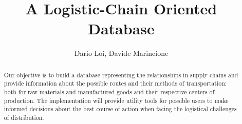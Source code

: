 \documentclass[a4paper, draft, technote, twocolumn, romanappendices]{IEEEtran}
\begin{document}
    \title{A Logistic-Chain Oriented Database}
    \author{Dario Loi, Davide Marincione}
    \maketitle
    \begin{abstract}
        Our objective is to build a database representing the relationships
        in supply chains and provide information about the possible routes
        and their methods of transportation: both for raw materials and
        manufactured goods and their respective centers of production.
        The implementation will provide utility tools for possible users
        to make informed decisions about the best course of
        action when facing the logistical challenges of distribution.
    \end{abstract}

    
\end{document}
